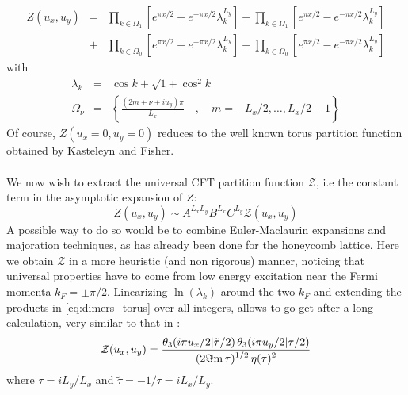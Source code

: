 \documentclass[11pt]{iopart}
\begin{document}
\begin{eqnarray}\nonumber
 Z(u_x,u_y)&=&\prod_{k\in \Omega_{1}}\left[e^{\pi x /2}+e^{-\pi x/2}\lambda_k^{L_y}\right]+\prod_{k\in \Omega_{1}}\left[e^{\pi x/2}-e^{-\pi x/2}\lambda_k^{L_y}\right]\\\label{eq:dimers_torus}
 &+&\prod_{k\in \Omega_{0}}\left[e^{\pi x /2}+e^{-\pi x/2}\lambda_k^{L_y}\right]-\prod_{k\in \Omega_{0}}\left[e^{\pi x /2}-e^{-\pi x/2}\lambda_k^{L_y}\right]
\end{eqnarray}
with
\begin{eqnarray}
 \lambda_k&=&\cos k +\sqrt{1+\cos^2 k}\\
\Omega_{\nu}&=&\left\{\frac{(2m+\nu+i u_y) \pi}{L_x}\quad,\quad m=-L_x/2,\ldots,L_x/2-1\right\} 
\end{eqnarray}
Of course, $Z(u_x=0,u_y=0)$ reduces to the well known torus partition function obtained by Kasteleyn and Fisher. 
\paragraph{}We now wish to extract the universal CFT partition function $\mathcal{Z}$, i.e the constant term in the asymptotic expansion of $Z$:
\begin{equation}
 Z(u_x,u_y)\sim A^{L_x L_y} B^{L_x} C^{L_y}\mathcal{Z}(u_x,u_y)
\end{equation}
A possible way to do so would be to combine Euler-Maclaurin expansions and majoration techniques, as has already been done for the honeycomb lattice\cite{Boutillier}. Here we obtain $\mathcal{Z}$ in a more heuristic (and non rigorous) manner, noticing that universal properties have to come from low energy excitation near the Fermi momenta $k_F=\pm \pi/2$. Linearizing $\ln(\lambda_k)$ around the two $k_F$ and extending the products in \ref{eq:dimers_torus} over all integers, allows to go get after a long calculation, very similar to that in \cite{Boutillier}:
\begin{equation}
 \mathcal{Z}(u_x,u_y)=\frac{\displaystyle{\theta_3(i\pi u_x/2|\tilde{\tau}/2)\,\theta_3(i\pi u_y/2|\tau/2)}}{\displaystyle{(2 \Im{\rm m}\, \tau)^{1/2}\,\eta(\tau)^2}}
\end{equation}
where $\tau=i L_y/L_x$ and $\tilde{\tau}=-1/\tau=iL_x/L_y$. 
\end{document}

